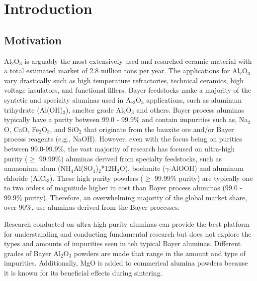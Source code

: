 \chapter{Introduction} \label{chapter1:introduction}

\section{Motivation}
Al$_{2}$O$_{3}$ is arguably the most extensively used and resarched ceramic material with a total estimated market of 2.8 million tons per year.  The applications for Al$_{2}$O$_{3}$ vary drastically such as high temperature refractories, technical ceramics, high voltage insulators, and functional fillers. Bayer feedstocks make a majority of the syntetic and specialty aluminas used in Al$_{2}$O$_{3}$ applications, such as aluminum trihydrate (Al(OH)$_{3}$), smelter grade Al$_{2}$O$_{3}$ and others. Bayer process aluminas typically have a purity between 99.0 - 99.9\% and contain impurities such as, Na$_{2}$O, CaO, Fe$_{2}$O$_{3}$, and SiO$_{2}$ that originate from the bauxite ore and/or Bayer process reagents (e.g., NaOH). However, even with the focus being on purities between 99.0-99.9\%, the vast majority of research has focused on ultra-high purity ($\geq$ 99.99\%) aluminas derived from specialty feedstocks, such as ammonium alum (NH$_{4}$Al(SO$_{4}$)$_{2}$*12H$_{2}$O), boehmite ($\gamma$-AlOOH) and aluminum chloride (AlCl$_{3}$). These high purity powders ($\geq$ 99.99\% purity) are typically one to two orders of magnitude higher in cost than Bayer process aluminas (99.0 - 99.9\% purity). Therefore, an overwhelming majority of the global market share, over 90\%, use aluminas derived from the Bayer processes.

Research conducted on ultra-high purity aluminas can provide the best platform for understanding and conducting fundamental research but does not explore the types and amounts of impurities seen in teh typical Bayer aluminas. Different grades of Bayer Al$_{2}$O$_{3}$ powders are made that range in the amount and type of impurities. Additionally, MgO is added to commerical alumina powders because it is known for its beneficial effects during sintering. 

